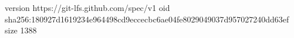 version https://git-lfs.github.com/spec/v1
oid sha256:180927d1619234e964498cd9eccecbc6ae04fe8029049037d957027240dd63ef
size 1388

